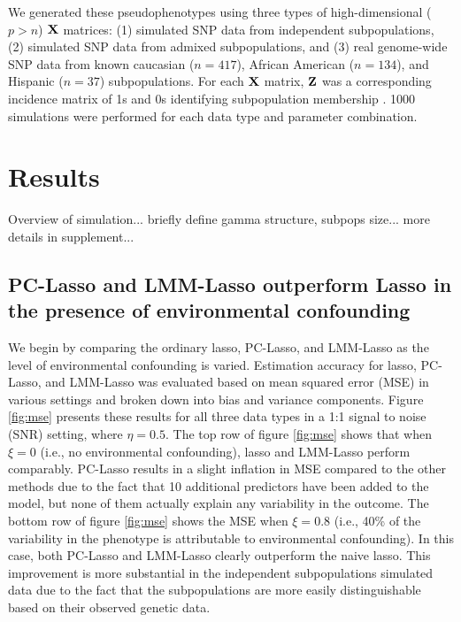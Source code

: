 We generated these pseudophenotypes using three types of high-dimensional ($p > n$) $\textbf{X}$ matrices: (1) simulated SNP data from independent subpopulations, (2) simulated SNP data from admixed subpopulations, and (3) real genome-wide SNP data from known caucasian ($n = 417$), African American ($n = 134$), and Hispanic ($n = 37$) subpopulations.  For each $\textbf{X}$ matrix, $\textbf{Z}$ was a corresponding incidence matrix of 1s and 0s identifying subpopulation membership . 1000 simulations were performed for each data type and parameter combination.

\section{Results} \label{sec:results}

Overview of simulation... briefly define gamma structure, subpops size... more details in supplement...

\subsection{PC-Lasso and LMM-Lasso outperform Lasso in the presence of environmental confounding}

We begin by comparing the ordinary lasso, PC-Lasso, and LMM-Lasso as the level of environmental confounding is varied. Estimation accuracy for lasso, PC-Lasso, and LMM-Lasso was evaluated based on mean squared error (MSE) in various settings and broken down into bias and variance components.  Figure \ref{fig:mse} presents these results for all three data types in a 1:1 signal to noise (SNR) setting, where $\eta = 0.5$. The top row of figure \ref{fig:mse} shows that when $\xi = 0$ (i.e., no environmental confounding), lasso and LMM-Lasso perform comparably. PC-Lasso results in a slight inflation in MSE compared to the other methods due to the fact that 10 additional predictors have been added to the model, but none of them actually explain any variability in the outcome. The bottom row of figure \ref{fig:mse} shows the MSE when $\xi = 0.8$ (i.e., 40\% of the variability in the phenotype is attributable to environmental confounding). In this case, both PC-Lasso and LMM-Lasso clearly outperform the naive lasso. This improvement is more substantial in the independent subpopulations simulated data due to the fact that the subpopulations are more easily distinguishable based on their observed genetic data.


